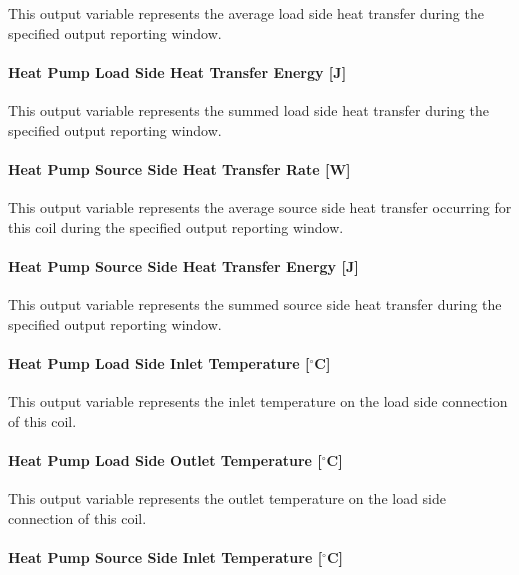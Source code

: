 This output variable represents the average load side heat transfer during the specified output reporting window.

\paragraph{Heat Pump Load Side Heat Transfer Energy {[}J{]}}\label{plhp_eir_outputs_q_load_sum}

This output variable represents the summed load side heat transfer during the specified output reporting window.

\paragraph{Heat Pump Source Side Heat Transfer Rate {[}W{]}}\label{plhp_eir_outputs_q_source}

This output variable represents the average source side heat transfer occurring for this coil during the specified output reporting window.

\paragraph{Heat Pump Source Side Heat Transfer Energy {[}J{]}}\label{plhp_eir_outputs_q_src_sum}

This output variable represents the summed source side heat transfer during the specified output reporting window.

\paragraph{Heat Pump Load Side Inlet Temperature {[}$^\circ$C{]}}\label{plhp_eir_outputs_t_load_in}

This output variable represents the inlet temperature on the load side connection of this coil.

\paragraph{Heat Pump Load Side Outlet Temperature {[}$^\circ$C{]}}\label{plhp_eir_outputs_t_load_out}

This output variable represents the outlet temperature on the load side connection of this coil.

\paragraph{Heat Pump Source Side Inlet Temperature {[}$^\circ$C{]}}\label{plhp_eir_outputs_t_source_in}

